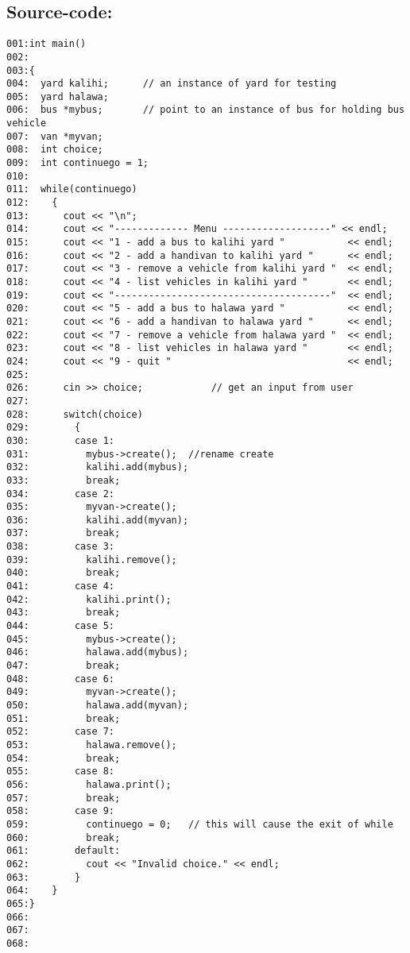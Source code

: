 \subsection*{Source-code:}
\begin{verbatim}
001:int main()
002:
003:{
004:  yard kalihi;      // an instance of yard for testing
005:  yard halawa;
006:  bus *mybus;       // point to an instance of bus for holding bus vehicle
007:  van *myvan;       
008:  int choice;
009:  int continuego = 1;
010:
011:  while(continuego)
012:    {
013:      cout << "\n";
014:      cout << "------------- Menu -------------------" << endl;
015:      cout << "1 - add a bus to kalihi yard "           << endl;
016:      cout << "2 - add a handivan to kalihi yard "      << endl;
017:      cout << "3 - remove a vehicle from kalihi yard "  << endl;
018:      cout << "4 - list vehicles in kalihi yard "       << endl;
019:      cout << "--------------------------------------"  << endl;
020:      cout << "5 - add a bus to halawa yard "           << endl;
021:      cout << "6 - add a handivan to halawa yard "      << endl;
022:      cout << "7 - remove a vehicle from halawa yard "  << endl;
023:      cout << "8 - list vehicles in halawa yard "       << endl;
024:      cout << "9 - quit "                               << endl;
025:
026:      cin >> choice;            // get an input from user
027:
028:      switch(choice)
029:        {
030:        case 1:
031:          mybus->create();  //rename create
032:          kalihi.add(mybus);
033:          break;
034:        case 2:
035:          myvan->create();
036:          kalihi.add(myvan);
037:          break;
038:        case 3:
039:          kalihi.remove();
040:          break;
041:        case 4:
042:          kalihi.print();
043:          break;
044:        case 5:
045:          mybus->create();
046:          halawa.add(mybus);
047:          break;
048:        case 6:
049:          myvan->create();
050:          halawa.add(myvan);
051:          break;
052:        case 7:
053:          halawa.remove();
054:          break;
055:        case 8:
056:          halawa.print();
057:          break;
058:        case 9:
059:          continuego = 0;   // this will cause the exit of while
060:          break;
061:        default:
062:          cout << "Invalid choice." << endl;
063:        }
064:    }
065:}
066:
067:
068:
\end{verbatim}

